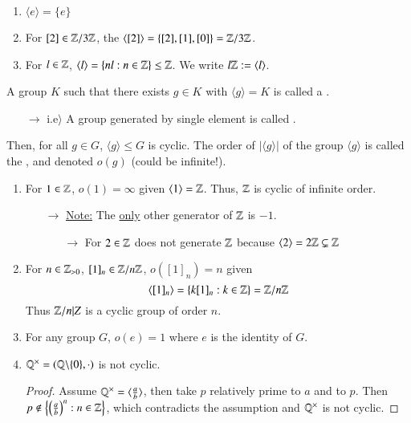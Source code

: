 \begin{example}
    \leavevmode
    \begin{enumerate}
        \item $\langle e \rangle = \{e\}$
        \item For $[2] \in \mathbb Z/3\mathbb Z$, the $\langle [2] \rangle = \{[2], [1], [0]\} = \mathbb Z/3\mathbb Z$.
        \item For $l \in \mathbb Z$, $\langle l \rangle = \{nl:n\in\mathbb Z\}\leq \mathbb Z$. We write $l\mathbb Z := \langle l \rangle$.
    \end{enumerate}
\end{example}

\begin{definition}
    A group $K$ such that there exists $g \in K$ with $\langle g \rangle = K$ is called a .
\end{definition}
\begin{enumerate}
    \item[$\rightarrow$] i.e$\rangle$ A group generated by single element is called .
\end{enumerate}


\begin{definition}
    Then, for all $g \in G$, $\langle g \rangle \leq G$ is cyclic. The order of $|\langle g \rangle|$ of the group $\langle g \rangle$ is called the , and denoted $o(g)$ (could be infinite!).
\end{definition}


\begin{example}
    \leavevmode
    \begin{enumerate}
        \item For $1 \in \mathbb Z$, $o(1) = \infty$ given $\langle 1 \rangle = \mathbb Z$. Thus, $\mathbb Z$ is cyclic of infinite order.
        \begin{enumerate}
            \item[$\rightarrow$] \underline{Note:} The \underline{only} other generator of $\mathbb Z$ is $-1$.
            \begin{enumerate}
                \item[$\rightarrow$] For $2 \in \mathbb Z$ does not generate $\mathbb Z$ because $\langle 2 \rangle = 2\mathbb Z \subsetneq \mathbb Z$ 
            \end{enumerate}
        \end{enumerate}
        \item For $n \in \mathbb Z_{>0}$, $[1]_n \in \mathbb Z/n\mathbb Z$, $o([1]_n) = n$ given $$\langle [1]_n\rangle = \{k[1]_n:k \in \mathbb Z\} = \mathbb Z/n\mathbb Z$$
        Thus $\mathbb Z/n|Z$ is a cyclic group of order $n$.
        \item For any group $G$, $o(e) = 1$ where $e$ is the identity of $G$.
        \item $\mathbb Q^{\times} = (\mathbb Q\backslash\{0\},\cdot)$ is not cyclic.
        \begin{proof}
            Assume $\mathbb Q^{\times} = \langle \frac{a}{b}\rangle$, then take $p$ relatively prime to $a$ and to $p$. Then $p \notin \left\{\left(\frac{a}{b}\right)^n: n \in \mathbb Z\right\}$, which contradicts the assumption and $\mathbb Q^{\times}$ is not cyclic.
        \end{proof}
    \end{enumerate}
\end{example}


